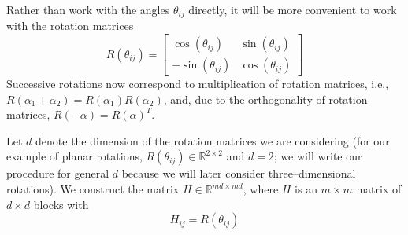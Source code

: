 \documentclass[11pt]{article}
\begin{document}
Rather than work with the angles $\theta_{ij}$ directly, it will be more convenient to work with the rotation matrices 
\begin{equation} \label{eq:R_theta}
R(\theta_{ij}) = \begin{bmatrix}
\cos(\theta_{ij}) & \sin(\theta_{ij}) \\
-\sin(\theta_{ij}) & \cos(\theta_{ij})
\end{bmatrix}
\end{equation}
%
Successive rotations now correspond to multiplication of rotation matrices, i.e., 
$R(\alpha_1 + \alpha_2) = R(\alpha_1) R(\alpha_2)$,
and, due to the orthogonality of rotation matrices, $R(-\alpha) = R(\alpha)^T$.

Let $d$ denote the dimension of the rotation matrices we are considering (for our example of planar rotations, $R(\theta_{ij}) \in \mathbb{R}^{2 \times 2}$ and $d=2$; we will write our procedure for general $d$ because we will later consider three--dimensional rotations).
%
We construct the matrix $H \in \mathbb{R}^{md \times md}$, where $H$ is an $m \times m$ matrix of $d \times d$ blocks with
\begin{equation} \label{eq:H_to_R}
H_{ij} = R(\theta_{ij})
\end{equation}
%
\end{document}
